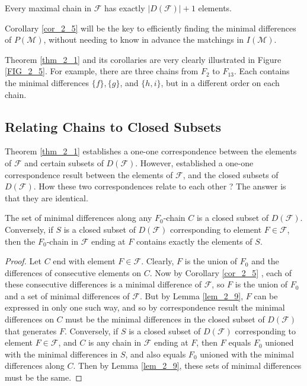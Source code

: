 \begin{corollary}\label{cor_2_6}
    Every maximal chain in $\mathcal{F}$ has exactly $|D(\mathcal{F})|+1$ elements.
\end{corollary}

Corollary \ref{cor_2_5} will be the key to efficiently finding the minimal differences of $P(\mathcal{M})$, without needing to know in advance the matchings in $I(\mathcal{M})$.

Theorem \ref{thm_2_1} and its corollaries are very clearly illustrated in Figure \ref{FIG_2_5}. For example, there are three chains from $F_2$ to $F_{13}$. Each contains the minimal differences $\{f\},\{g\}$, and $\{h, i\}$, but in a different order on each chain. 

\subsection{Relating Chains to Closed Subsets}

Theorem \ref{thm_2_1} establishes a one-one correspondence between the elements of $\mathcal{F}$ and certain subsets of $D(\mathcal{F})$. However, established a one-one correspondence result between the elements of $\mathcal{F}$, and the closed subsets of $D(\mathcal{F})$. How these two correspondences relate to each other ? The answer is that they are identical.

\begin{theorem}\label{thm_2_2}
    The set of minimal differences along any $F_0$-chain $C$ is a closed subset of $D(\mathcal{F})$. Conversely, if $S$ is a closed subset of $D(\mathcal{F})$ corresponding to element $F \in \mathcal{F}$, then the $F_0$-chain in $\mathcal{F}$ ending at $F$ contains exactly the elements of $S$.
\end{theorem}

\begin{proof}
    Let $C$ end with element $F \in \mathcal{F}$. Clearly, $F$ is the union of $F_0$ and the differences of consecutive elements on $C$. Now by Corollary \ref{cor_2_5} , each of these consecutive differences is a minimal difference of $\mathcal{F}$, so $F$ is the union of $F_0$ and a set of minimal differences of $\mathcal{F}$. But by Lemma \ref{lem_2_9}, $F$ can be expressed in only one such way, and so by correspondence result the minimal differences on $C$ must be the minimal differences in the closed subset of $D(\mathcal{F})$ that generates $F$. Conversely, if $S$ is a closed subset of $D(\mathcal{F})$ corresponding to element $F \in \mathcal{F}$, and $C$ is any chain in $\mathcal{F}$ ending at $F$, then $F$ equals $F_0$ unioned with the minimal differences in $S$, and also equals $F_0$ unioned with the minimal differences along $C$. Then by Lemma \ref{lem_2_9}, these sets of minimal differences must be the same.
\end{proof}

